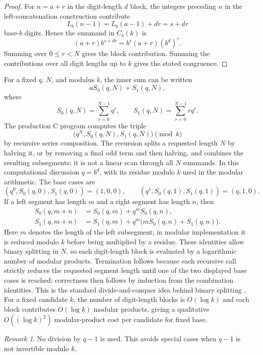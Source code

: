 \documentclass[11pt]{article}
\theoremstyle{definition}
\theoremstyle{remark}
\newtheorem{remark}{Remark}
\begin{document}
\begin{proof}
For \(n=a+r\) in the digit-length \(d\) block, the integers preceding \(n\)
in the left-concatenation construction contribute
\[
  L_b(n-1)=L_b(a-1)+dr=s+dr
\]
base-\(b\) digits.  Hence the summand in \(C_b(k)\) is
\[
  (a+r)b^{s+dr}=b^s(a+r)(b^d)^r.
\]
Summing over \(0\le r<N\) gives the block contribution.  Summing the
contributions over all digit lengths up to \(k\) gives the stated congruence.
\end{proof}

For a fixed \(q\), \(N\), and modulus \(k\), the inner sum can be written
\[
  aS_0(q,N)+S_1(q,N),
\]
where
\[
  S_0(q,N)=\sum_{r=0}^{N-1}q^r,\qquad
  S_1(q,N)=\sum_{r=0}^{N-1}r q^r.
\]
The production C program computes the triple
\[
  \bigl(q^N,S_0(q,N),S_1(q,N)\bigr)\pmod{k}
\]
by recursive series composition.  The recursion splits a requested length
\(N\) by halving it, or by removing a final odd term and then halving, and
combines the resulting subsegments; it is not a linear scan through all
\(N\) summands.  In this computational discussion \(q=b^d\), with its
residue modulo \(k\) used in the modular arithmetic.  The base cases are
\[
  (q^0,S_0(q,0),S_1(q,0))=(1,0,0),\qquad
  (q^1,S_0(q,1),S_1(q,1))=(q,1,0).
\]
If a left segment has length \(m\) and a
right segment has length \(n\), then
\[
\begin{aligned}
S_0(q,m+n)
  &= S_0(q,m)+q^mS_0(q,n),\\
S_1(q,m+n)
  &= S_1(q,m)+q^m\bigl(mS_0(q,n)+S_1(q,n)\bigr).
\end{aligned}
\]
Here \(m\) denotes the length of the left subsegment; in modular
implementation it is reduced modulo \(k\) before being multiplied by a
residue.
These identities allow binary splitting in \(N\), so each digit-length block
is evaluated by a logarithmic number of modular products.  Termination follows
because each recursive call strictly reduces the requested segment length
until one of the two displayed base cases is reached; correctness then follows
by induction from the combination identities.  This is the standard
divide-and-conquer idea behind binary splitting
\cite{brentZimmermann2010}.  For a fixed candidate \(k\), the number of
digit-length blocks is \(O(\log k)\) and each block contributes
\(O(\log k)\) modular products, giving a qualitative
\(O((\log k)^2)\) modular-product cost per candidate for fixed base.

\begin{remark}
No division by \(q-1\) is used.  This avoids special cases when \(q-1\) is not
invertible modulo \(k\).
\end{remark}
\end{document}
